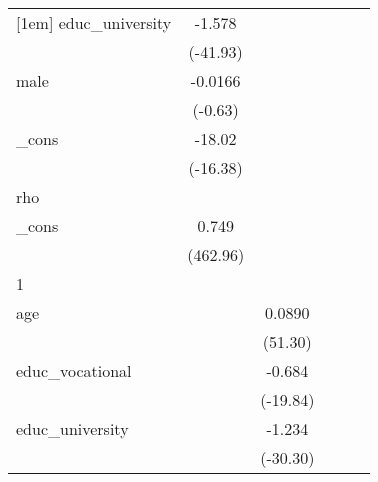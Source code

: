 {\begin{tabular}{l*{5}{c}}
[1em]
educ\_university&      -1.578\sym{***}&                     &                     &                     &                     \\
            &    (-41.93)         &                     &                     &                     &                     \\
[1em]
male        &     -0.0166         &                     &                     &                     &                     \\
            &     (-0.63)         &                     &                     &                     &                     \\
[1em]
\_cons      &      -18.02\sym{***}&                     &                     &                     &                     \\
            &    (-16.38)         &                     &                     &                     &                     \\
\hline
rho         &                     &                     &                     &                     &                     \\
\_cons      &       0.749\sym{***}&                     &                     &                     &                     \\
            &    (462.96)         &                     &                     &                     &                     \\
\hline
1           &                     &                     &                     &                     &                     \\
age         &                     &      0.0890\sym{***}&                     &                     &                     \\
            &                     &     (51.30)         &                     &                     &                     \\
[1em]
educ\_vocational&                     &      -0.684\sym{***}&                     &                     &                     \\
            &                     &    (-19.84)         &                     &                     &                     \\
[1em]
educ\_university&                     &      -1.234\sym{***}&                     &                     &                     \\
            &                     &    (-30.30)         &                     &                     &                     \\

\end{tabular}}
